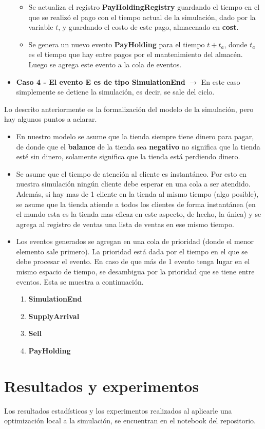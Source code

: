 \documentclass{article}
\begin{document}
\begin{itemize}
\begin{itemize}
        \item Se actualiza el registro \textbf{PayHoldingRegistry} guardando el tiempo en el que se realizó el pago con el tiempo actual de la simulación, dado por la variable $t$, y guardando el costo de este pago, almacenado en \textbf{cost}.
        \item Se genera un nuevo evento \textbf{PayHolding} para el tiempo $t + t_a$, donde $t_a$ es el tiempo que hay entre pagos por el mantenimiento del almacén. Luego se agrega este evento a la cola de eventos.
    \end{itemize}
    \item \textbf{Caso 4 - El evento E es de tipo SimulationEnd} $\to$ En este caso simplemente se detiene la simulación, es decir, se sale del ciclo.
\end{itemize}

Lo descrito anteriormente es la formalización del modelo de la simulación, pero hay algunos puntos a aclarar.
\begin{itemize}
    \item En nuestro modelo se asume que la tienda siempre tiene dinero para pagar, de donde que el \textbf{balance} de la tienda sea \textbf{negativo} no significa que la tienda esté sin dinero, solamente significa que la tienda está perdiendo dinero.
    \item Se asume que el tiempo de atención al cliente es instantáneo. Por esto en nuestra simulación ningún cliente debe esperar en una cola a ser atendido. Además, si hay mas de 1 cliente en la tienda al mismo tiempo (algo posible), se asume que la tienda atiende a todos los clientes de forma instantánea (en el mundo esta es la tienda mas eficaz en este aspecto, de hecho, la única) y se agrega al registro de ventas una lista de ventas en ese mismo tiempo.
    \item Los eventos generados se agregan en una cola de prioridad (donde el menor elemento sale primero). La prioridad está dada por el tiempo en el que se debe procesar el evento. En caso de que más de 1 evento tenga lugar en el mismo espacio de tiempo, se desambigua por la prioridad que se tiene entre eventos. Esta se muestra a continuación.
    \begin{enumerate}
        \item \textbf{SimulationEnd}
        \item \textbf{SupplyArrival}
        \item \textbf{Sell}
        \item \textbf{PayHolding}
    \end{enumerate}
\end{itemize}

\section{Resultados y experimentos}

Los resultados estadísticos y los experimentos realizados al aplicarle una optimización local
a la simulación, se encuentran en el notebook del repositorio.
\end{document}
